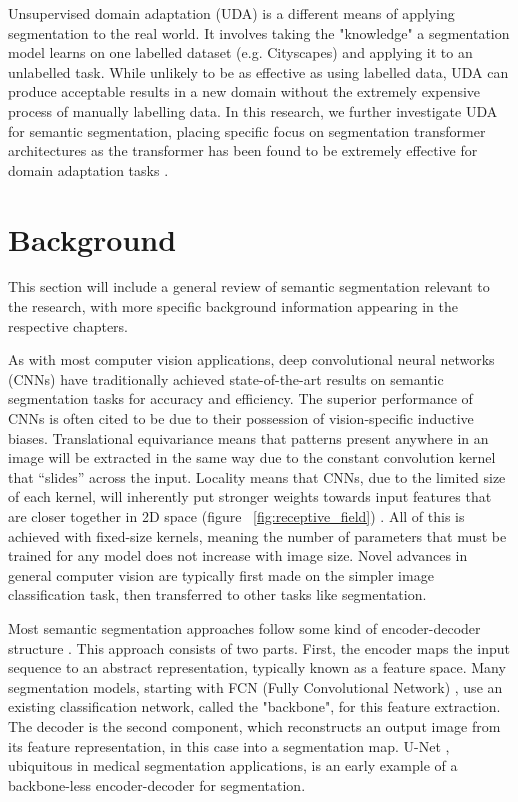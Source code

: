 \documentclass[a4paper,12pt]{report}
\begin{document}
Unsupervised domain adaptation (UDA) is a different means of applying segmentation to the real world. It involves taking the "knowledge" a segmentation model learns on one labelled dataset (e.g. Cityscapes) and applying it to an unlabelled task. While unlikely to be as effective as using labelled data, UDA can produce acceptable results in a new domain without the extremely expensive process of manually labelling data. In this research, we further investigate UDA for semantic segmentation, placing specific focus on segmentation transformer architectures as the transformer has been found to be extremely effective for domain adaptation tasks \cite{yang_tvt_2021} \cite{xu_cdtrans_2021} \cite{hoyer_daformer_2022}.


\section{Background}
This section will include a general review of semantic segmentation relevant to the research, with more specific background information appearing in the respective chapters.

As with most computer vision applications, deep convolutional neural networks (CNNs) have traditionally achieved state-of-the-art results on semantic segmentation tasks for accuracy and efficiency. The superior performance of CNNs is often cited to be due to their possession of vision-specific inductive biases. Translational equivariance means that patterns present anywhere in an image will be extracted in the same way due to the constant convolution kernel that “slides” across the input. Locality means that CNNs, due to the limited size of each kernel, will inherently put stronger weights towards input features that are closer together in 2D space (figure ~\ref{fig:receptive_field}) \cite{zhang_dive_2019}. All of this is achieved with fixed-size kernels, meaning the number of parameters that must be trained for any model does not increase with image size. Novel advances in general computer vision are typically first made on the simpler image classification task, then transferred to other tasks like segmentation.

Most semantic segmentation approaches follow some kind of encoder-decoder structure \cite{zhang_dive_2019}. This approach consists of two parts. First, the encoder maps the input sequence to an abstract representation, typically known as a feature space. Many segmentation models, starting with FCN (Fully Convolutional Network) \cite{long_fully_2015}, use an existing classification network, called the "backbone", for this feature extraction. The decoder is the second component, which reconstructs an output image from its feature representation, in this case into a segmentation map. U-Net \cite{ronneberger_u-net_2015}, ubiquitous in medical segmentation applications, is an early example of a backbone-less encoder-decoder for segmentation.
\end{document}
